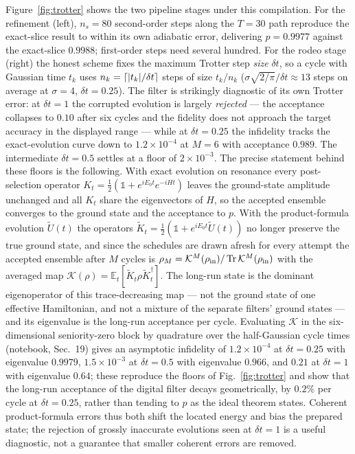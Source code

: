 \documentclass[
  aps,            %
  prc,            %
  reprint,        %
  superscriptaddress,
  floatfix,
  nofootinbib
]{revtex4-2}
\begin{document}
Figure~\ref{fig:trotter} shows the two pipeline stages under this compilation.
For the refinement (left), $n_s=80$ second-order steps along the $T=30$ path
reproduce the exact-slice result to within its own adiabatic error, delivering
$p=0.9977$ against the exact-slice $0.9988$; first-order steps need several
hundred.  For the rodeo stage (right) the honest scheme fixes the maximum
Trotter step \emph{size} $\delta t$, so a cycle with Gaussian time $t_k$ uses
$n_k=\lceil \abs{t_k}/\delta t\rceil$ steps of size $t_k/n_k$
($\sigma\sqrt{2/\pi}/\delta t\approx13$ steps on average at $\sigma=4$,
$\delta t=0.25$).  The filter is strikingly diagnostic of its own Trotter
error: at $\delta t=1$ the corrupted evolution is largely \emph{rejected} ---
the acceptance collapses to $0.10$ after six cycles and the fidelity does not
approach the target accuracy in the displayed range --- while at
$\delta t=0.25$ the infidelity tracks the exact-evolution curve down to
$1.2\times10^{-4}$ at $M=6$ with acceptance $0.989$.  The intermediate
$\delta t=0.5$ settles at a floor of $2\times10^{-3}$.  The precise
statement behind these floors is the following.  With exact evolution on
resonance every post-selection operator $K_t=\tfrac12(\mathbb1+e^{iE_0t}e^{-iHt})$
leaves the ground-state amplitude unchanged and all $K_t$ share the
eigenvectors of $H$, so the accepted ensemble converges to the ground state
and the acceptance to $p$.  With the product-formula evolution $\tilde U(t)$
the operators $\tilde K_t=\tfrac12(\mathbb1+e^{iE_0t}\tilde U(t))$ no longer
preserve the true ground state, and since the schedules are drawn afresh
for every attempt the accepted ensemble after $M$ cycles is
$\rho_M=\mathcal K^M(\rho_{\rm in})/\Tr\mathcal K^M(\rho_{\rm in})$ with the
averaged map $\mathcal K(\rho)=\mathbb E_t[\tilde K_t\rho\tilde K_t^\dagger]$.
The long-run state is the dominant eigenoperator of this trace-decreasing map
--- not the ground state of one effective Hamiltonian, and not a mixture of
the separate filters' ground states --- and its eigenvalue is the long-run
acceptance per cycle.  Evaluating $\mathcal K$ in the six-dimensional
seniority-zero block by quadrature over the half-Gaussian cycle times
(notebook, Sec.~19) gives an asymptotic infidelity of $1.2\times10^{-4}$ at
$\delta t=0.25$ with eigenvalue $0.9979$, $1.5\times10^{-3}$ at
$\delta t=0.5$ with eigenvalue $0.966$, and $0.21$ at $\delta t=1$ with
eigenvalue $0.64$; these reproduce the floors of Fig.~\ref{fig:trotter} and
show that the long-run acceptance of the digital filter decays geometrically,
by $0.2\%$ per cycle at $\delta t=0.25$, rather than tending to $p$ as the
ideal theorem states.  Coherent product-formula errors thus both shift the
located energy and bias the prepared state; the rejection of grossly
inaccurate evolutions seen at $\delta t=1$ is a useful diagnostic, not a
guarantee that smaller coherent errors are removed.
\end{document}
